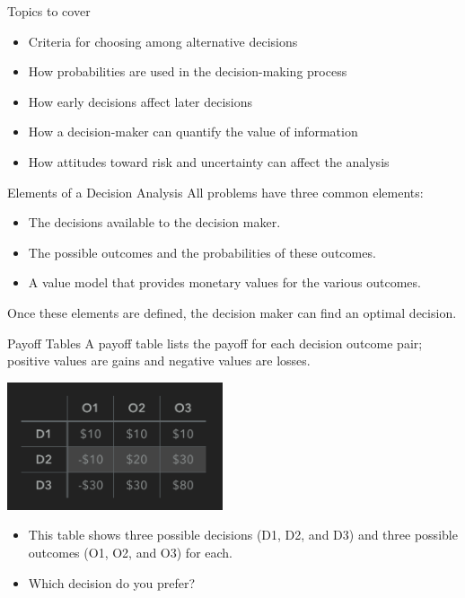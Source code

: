 \documentclass{beamer}\usepackage[]{graphicx}\usepackage[]{color}
\begin{document}
\begin{darkframes}
    \begin{frame}[fragile]{Topics to cover}
          \begin{itemize}[<+->]
            \item Criteria for choosing among alternative decisions
            \item How probabilities are used in the decision-making process
            \item How early decisions affect later decisions
            \item How a decision-maker can quantify the value of information
            \item How attitudes toward risk and uncertainty can affect the analysis
          \end{itemize}

    \end{frame}


    \begin{frame}[fragile]{Elements of a Decision Analysis}
      All problems have three common elements:

        \begin{itemize}
            \item The decisions available to the decision maker.
            \item The possible outcomes and the probabilities of these outcomes.
            \item A value model that provides monetary values for the various outcomes.
        \end{itemize}

      Once these elements are defined, the decision maker can find an optimal decision.
    \end{frame}


    \begin{frame}[fragile]{Payoff Tables}
      A payoff table lists the payoff for each decision outcome pair; positive values are gains and negative values are losses.

        \begin{center}
          \includegraphics[width=2.5in]{PayoffTable} 
        \end{center}
        \begin{itemize}
            \item This table shows three possible decisions (D1, D2, and D3) and three
            possible outcomes (O1, O2, and O3) for each.
            \item Which decision do you prefer?
        \end{itemize}


\end{frame}
\end{darkframes}
\end{document}
